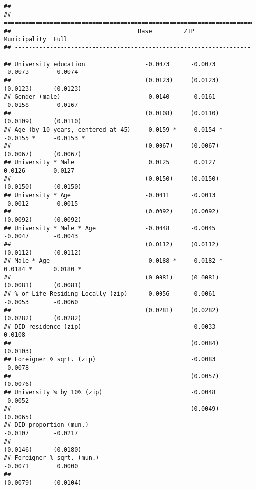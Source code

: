 \documentclass[
]{article}
\begin{document}
\begin{verbatim}
## 
## ======================================================================================
##                                    Base         ZIP          Municipality  Full       
## --------------------------------------------------------------------------------------
## University education                 -0.0073      -0.0073      -0.0073       -0.0074  
##                                      (0.0123)     (0.0123)     (0.0123)      (0.0123) 
## Gender (male)                        -0.0140      -0.0161      -0.0158       -0.0167  
##                                      (0.0108)     (0.0110)     (0.0109)      (0.0110) 
## Age (by 10 years, centered at 45)    -0.0159 *    -0.0154 *    -0.0155 *     -0.0153 *
##                                      (0.0067)     (0.0067)     (0.0067)      (0.0067) 
## University * Male                     0.0125       0.0127       0.0126        0.0127  
##                                      (0.0150)     (0.0150)     (0.0150)      (0.0150) 
## University * Age                     -0.0011      -0.0013      -0.0012       -0.0015  
##                                      (0.0092)     (0.0092)     (0.0092)      (0.0092) 
## University * Male * Age              -0.0048      -0.0045      -0.0047       -0.0043  
##                                      (0.0112)     (0.0112)     (0.0112)      (0.0112) 
## Male * Age                            0.0188 *     0.0182 *     0.0184 *      0.0180 *
##                                      (0.0081)     (0.0081)     (0.0081)      (0.0081) 
## % of Life Residing Locally (zip)     -0.0056      -0.0061      -0.0053       -0.0060  
##                                      (0.0281)     (0.0282)     (0.0282)      (0.0282) 
## DID residence (zip)                                0.0033                     0.0108  
##                                                   (0.0084)                   (0.0103) 
## Foreigner % sqrt. (zip)                           -0.0083                    -0.0078  
##                                                   (0.0057)                   (0.0076) 
## University % by 10% (zip)                         -0.0048                    -0.0052  
##                                                   (0.0049)                   (0.0065) 
## DID proportion (mun.)                                          -0.0107       -0.0217  
##                                                                (0.0146)      (0.0180) 
## Foreigner % sqrt. (mun.)                                       -0.0071        0.0000  
##                                                                (0.0079)      (0.0104) 

\end{verbatim}
\end{document}
